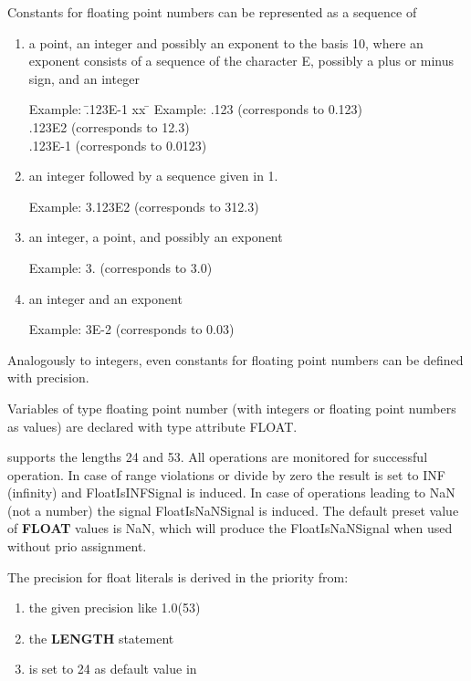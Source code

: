 Constants for floating point numbers can be represented as a sequence of
\begin{enumerate}
\item a point, an integer and possibly an exponent to the basis 10,
where an exponent consists of a sequence of the character E, possibly a
plus or minus sign, and an integer

\begin{tabbing}
Example: \= .123E-1 xx \=  \kill
Example: \> .123 \> (corresponds to 0.123)\\
 \> .123E2 \> (corresponds to 12.3)\\
 \> .123E-1 \> (corresponds to 0.0123)
\end{tabbing}

\item an integer followed by a sequence given in 1.

Example: 3.123E2 (corresponds to 312.3)

\item an integer, a point, and possibly an exponent

Example: 3. (corresponds to 3.0)

\item an integer and an exponent

Example: 3E-2 (corresponds to 0.03)
\end{enumerate}

Analogously to integers, even constants for floating point numbers can
be defined with precision.

Variables of type floating point number (with integers or floating point
numbers as values) are declared with type attribute FLOAT.




\OpenPEARL{} supports the lengths 24 and 53.
All operations are monitored for successful operation.
In case of range violations or
divide by zero the result is set to INF (infinity) and
FloatIsINFSignal is induced.
In case of operations leading to NaN (not a number) the signal
FloatIsNaNSignal is induced.
The default preset value of {\bf FLOAT} values is NaN, which will produce
the FloatIsNaNSignal when used without prio assignment.

The precision for float literals is derived in the priority from: 
\begin{enumerate}
\item the given precision like 1.0(53)
\item the {\bf LENGTH} statement
\item is set to 24 as default value in \OpenPEARL
\end{enumerate}

